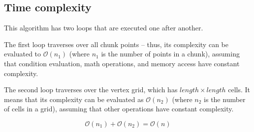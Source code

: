 \subsection{Time complexity}

This algorithm has two loops that are executed one after another.

The first loop traverses over all chunk points – thus, its complexity can be evaluated to $\mathcal{O}(n_1)$ (where $n_1$ is the number of points in a chunk), assuming that condition evaluation, math operations, and memory access have constant complexity.

The second loop traverses over the vertex grid, which has $length \times length$ cells. It means that its complexity can be evaluated as $\mathcal{O}(n_2)$ (where $n_2$ is the number of cells in a grid), assuming that other operations have constant complexity.

$$\mathcal{O}(n_1) + \mathcal{O}(n_2) = \mathcal{O}(n)$$

